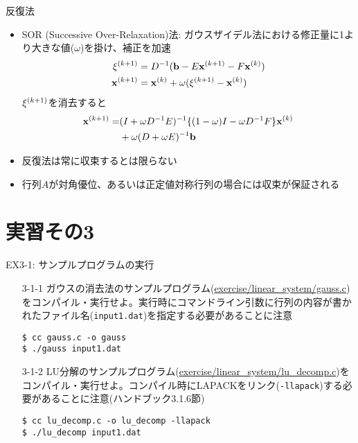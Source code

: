 \documentclass[dvipdfmx]{beamer}
\begin{document}
\begin{frame}[t,fragile]{反復法}
  \begin{itemize}
    \setlength{\itemsep}{1em}
  \item SOR (Successive Over-Relaxation)法: ガウスザイデル法における修正量に1より大きな値($\omega$)を掛け、補正を加速
    \begin{align*}
      {\bf \xi}^{(k+1)} &= D^{-1} ({\bf b} - E{\bf x}^{(k+1)} - F{\bf x}^{(k)}) \\
      {\bf x}^{(k+1)} &= {\bf x}^{(k)} + \omega({\bf \xi}^{(k+1)} - {\bf x}^{(k)})
    \end{align*}
    ${\bf \xi}^{(k+1)}$を消去すると
    \begin{align*}
      {\bf x}^{(k+1)} = &(I+\omega D^{-1}E)^{-1} \{(1-\omega)I - \omega D^{-1} F\}{\bf x}^{(k)} \\ &+ \omega(D+\omega E)^{-1}{\bf b}
    \end{align*}
    \item 反復法は常に収束するとは限らない
    \item 行列$A$が対角優位、あるいは正定値対称行列の場合には収束が保証される
  \end{itemize}
\end{frame}

\section{実習その3}

\begin{frame}[t,fragile]{EX3-1: サンプルプログラムの実行}
  \begin{itemize}
  \item[3-1-1] ガウスの消去法のサンプルプログラム(\href{https://github.com/todo-group/computer-experiments/blob/master/exercise/linear_system/gauss.c}{exercise/linear\_system/gauss.c})をコンパイル・実行せよ。実行時にコマンドライン引数に行列の内容が書かれたファイル名({\tt input1.dat})を指定する必要があることに注意
\begin{lstlisting}
$ cc gauss.c -o gauss
$ ./gauss input1.dat
\end{lstlisting}
  \item[3-1-2] LU分解のサンプルプログラム(\href{https://github.com/todo-group/computer-experiments/blob/master/exercise/linear_system/lu_decomp.c}{exercise/linear\_system/lu\_decomp.c})をコンパイル・実行せよ。コンパイル時にLAPACKをリンク({\tt -llapack})する必要があることに注意(ハンドブック3.1.6節)
\begin{lstlisting}
$ cc lu_decomp.c -o lu_decomp -llapack
$ ./lu_decomp input1.dat
\end{lstlisting}
  \end{itemize}
\end{frame}
\end{document}
